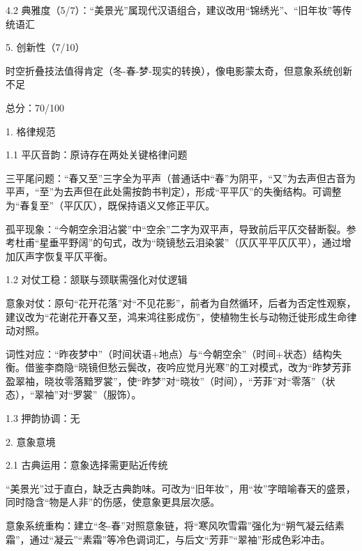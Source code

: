 \begin{tcolorbox}[
  breakable,            %
  colback=white, %
  colframe=black, 
  boxrule=1pt,        %
  arc=0mm             %
  ]
  \hspace{2em}4.2 典雅度（5/7）：“美景光”属现代汉语组合，建议改用“锦绣光”、“旧年妆”等传统语汇\par
  5. 创新性（7/10）\par
  \hspace{2em}时空折叠技法值得肯定（冬-春-梦-现实的转换），像电影蒙太奇，但意象系统创新不足\par
  总分：70/100\par\par
  [改进建议]\par
  1. 格律规范\par
  \hspace{2em}1.1 平仄音韵：原诗存在两处关键格律问题\par
  \hspace{2em}三平尾问题：“春又至”三字全为平声（普通话中“春”为阴平，“又”为去声但古音为平声，“至”为去声但在此处需按韵书判定），形成“平平仄”的失衡结构。可调整为“春复至”（平仄仄），既保持语义又修正平仄。\par
  \hspace{2em}孤平现象：“今朝空余泪沾裳”中“空余”二字为双平声，导致前后平仄交替断裂。参考杜甫“星垂平野阔”的句式，改为“晓镜愁云泪染裳”（仄仄平平仄仄平），通过增加仄声字恢复平仄平衡。\par
  \hspace{2em} 1.2 对仗工稳：颔联与颈联需强化对仗逻辑\par
  \hspace{2em}意象对仗：原句“花开花落”对“不见花影”，前者为自然循环，后者为否定性观察，建议改为“花谢花开春又至，鸿来鸿往影成伤”，使植物生长与动物迁徙形成生命律动对照。\par
  \hspace{2em}词性对应：“昨夜梦中”（时间状语+地点）与“今朝空余”（时间+状态）结构失衡。借鉴李商隐“晓镜但愁云鬓改，夜吟应觉月光寒”的工对模式，改为“昨梦芳菲盈翠袖，晓妆零落黯罗裳”，使“昨梦”对“晓妆”（时间），“芳菲”对“零落”（状态），“翠袖”对“罗裳”（服饰）。\par
  \hspace{2em}1.3 押韵协调：无\par
  2. 意象意境\par
  \hspace{2em}2.1 古典运用：意象选择需更贴近传统\par
  \hspace{2em}“美景光”过于直白，缺乏古典韵味。可改为“旧年妆”，用“妆”字暗喻春天的盛景，同时隐含“物是人非”的伤感，使意象更具层次感。\par
  \hspace{2em}意象系统重构：建立“冬-春”对照意象链，将“寒风吹雪霜”强化为“朔气凝云结素霜”，通过“凝云”“素霜”等冷色调词汇，与后文“芳菲”“翠袖”形成色彩冲击。\par

\end{tcolorbox}
